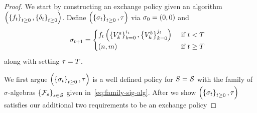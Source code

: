 \begin{proof}
    We start by constructing an exchange policy  
    given an algorithm
    \(
        \left(
            \left\{
                f_{t}
            \right\}_{t\geq 0}, 
            \left\{
                \delta_{t}
            \right\}_{t\geq 0}
        \right)
    \).
    Define 
    \(
        \left(
            \left\{
                \sigma_{t}
            \right\}_{t\geq 0},
            \tau
        \right)
    \) 
    via
    \(
        \sigma_{0} = (0,0)
    \)
    and
    \begin{align*}
        \qquad
        \sigma_{t+1}
        =
        \begin{cases}
            f_{t}\left(
                \left\{
                    V^a_{k}
                \right\}_{k=0}^{i_{t}}
                ,
                \left\{
                    V^b_{k}
                \right\}_{k=0}^{j_{t}}
            \right)
            & 
            \text{ if } t < T
            \\
            \left(
                n,m
            \right)
            &
            \text{ if } t \geq T
        \end{cases}  
    \end{align*}  
    along with setting
    \(
        \tau
        =
        T
    \).

    We first argue
    \(
        \left(
            \left\{
                \sigma_{t}
            \right\}_{t\geq 0},
            \tau
        \right)
    \) 
    is a well defined policy for 
    \(
        S=\mathcal{S}
    \)
    with the family of $\sigma$-algebras 
    \(
        \left\{
            \mathcal{F}_{s}
        \right\}_{s\in\mathcal{S}}
    \)
    given in~\eqref{eq:family-sig-alg}.
    After we show 
    \(
        \left(
            \left\{
                \sigma_{t}
            \right\}_{t\geq 0},
            \tau
        \right)
    \) 
    satisfies our additional two requirements to be an exchange policy


\end{proof}
